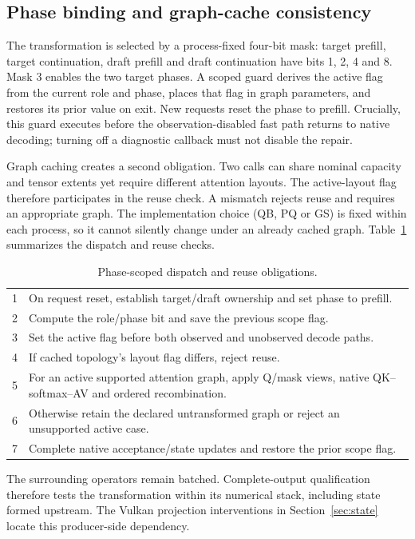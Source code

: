 \subsection{Phase binding and graph-cache consistency}
The transformation is selected by a process-fixed four-bit mask: target prefill, target continuation, draft prefill and draft continuation have bits 1, 2, 4 and 8. Mask 3 enables the two target phases. A scoped guard derives the active flag from the current role and phase, places that flag in graph parameters, and restores its prior value on exit. New requests reset the phase to prefill. Crucially, this guard executes before the observation-disabled fast path returns to native decoding; turning off a diagnostic callback must not disable the repair.

Graph caching creates a second obligation. Two calls can share nominal capacity and tensor extents yet require different attention layouts. The active-layout flag therefore participates in the reuse check. A mismatch rejects reuse and requires an appropriate graph. The implementation choice (QB, PQ or GS) is fixed within each process, so it cannot silently change under an already cached graph. Table~\ref{alg:scope} summarizes the dispatch and reuse checks.

\begin{table}[t]
\caption{Phase-scoped dispatch and reuse obligations.}
\label{alg:scope}
\begin{tabularx}{\columnwidth}{@{}rX@{}}\toprule
1 & On request reset, establish target/draft ownership and set phase to prefill.\\
2 & Compute the role/phase bit and save the previous scope flag.\\
3 & Set the active flag before both observed and unobserved decode paths.\\
4 & If cached topology's layout flag differs, reject reuse.\\
5 & For an active supported attention graph, apply Q/mask views, native QK--softmax--AV and ordered recombination.\\
6 & Otherwise retain the declared untransformed graph or reject an unsupported active case.\\
7 & Complete native acceptance/state updates and restore the prior scope flag.\\\bottomrule
\end{tabularx}
\end{table}

The surrounding operators remain batched. Complete-output qualification therefore tests the transformation within its numerical stack, including state formed upstream. The Vulkan projection interventions in Section~\ref{sec:state} locate this producer-side dependency.

